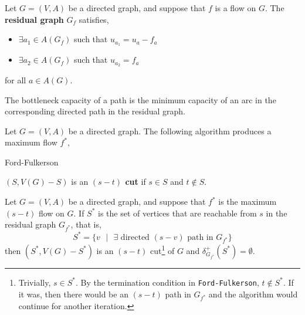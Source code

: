 	\begin{defn}
		Let $G = (V,A)$ be a directed graph, and suppose that $f$ is a flow on $G$. The \textbf{residual graph} $G_f$ satisfies,
		\begin{itemize}
			\item $\exists a_1 \in A(G_f)$ such that $u_{a_1} = u_a - f_a$
			\item $\exists a_2 \in A(G_f)$ such that $u_{a_2} = f_a$
		\end{itemize}
		\noindent for all $a \in A(G)$.
	\end{defn}

	\begin{rmk}
		The bottleneck capacity of a path is the minimum capacity of an arc in the corresponding directed path in the residual graph.
	\end{rmk}

	\begin{defn}
		Let $G = (V,A)$ be a directed graph. The following algorithm produces a maximum flow $f^*$,
	\begin{algorithm}
	  \caption{Ford-Fulkerson}\label{fordfulk}
	\end{algorithm}
	\end{defn}

	\begin{defn}[Cut]
		$(S, V(G) - S)$ is an \textbf{$(s-t)$ cut} if $s \in S$ and $t \notin S$.
	\end{defn}

	\begin{rmk}
		Let $G = (V, A)$ be a directed graph, and suppose that $f^*$ is the maximum $(s-t)$ flow on $G$. If $S^*$ is the set of vertices that are reachable from $s$ in the residual graph $G_{f^*}$, that is,
		\[S^* = \{v \text{ $|$ } \exists \text{ directed $(s-v)$ path in $G_{f^*}$}\}\]
		\noindent then $(S^*, V(G) - S^*)$ is an $(s-t)$ cut\footnote{Trivially, $s \in S^*$. By the termination condition in \texttt{Ford-Fulkerson}, $t \not\in S^*$. If it was, then there would be an $(s-t)$ path in $G_{f^*}$ and the algorithm would continue for another iteration.} of $G$ and $\delta^+_{G_{f^*}}(S^*) = \emptyset$.
	\end{rmk}

